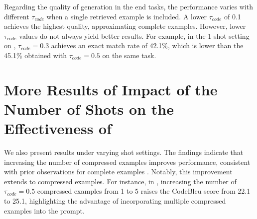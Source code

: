 Regarding the quality of generation in the end tasks, the performance varies with different $\tau_{code}$ when a single retrieved example is included. A lower $\tau_{code}$ of 0.1 achieves the highest quality, approximating complete examples. However, lower $\tau_{code}$ values do not always yield better results. For example, in the 1-shot setting on \taskone, $\tau_{code}=0.3$ achieves an exact match rate of 42.1\%, which is lower than the 45.1\% obtained with $\tau_{code}=0.5$ on the same task. 



\section{More Results of Impact of the Number of Shots on the Effectiveness of \ourtool}\label{sec:appendix_shot}

We also present results under varying shot settings. The findings indicate that increasing the number of compressed examples improves performance, consistent with prior observations for complete examples \citep{he2024}. Notably, this improvement extends to compressed examples. For instance, in \taskthree, increasing the number of $\tau_{code}=0.5$ compressed examples from 1 to 5 raises the CodeBleu score from 22.1 to 25.1, highlighting the advantage of incorporating multiple compressed examples into the prompt.






